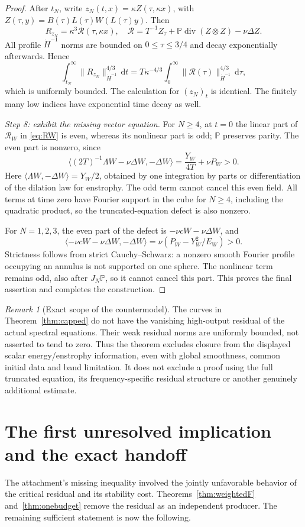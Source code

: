 \documentclass[11pt,a4paper]{article}
\theoremstyle{definition}\newtheorem{definition}[theorem]{Definition}
\theoremstyle{remark}\newtheorem{remark}[theorem]{Remark}
\newcommand{\PP}{\mathbb P}
\newcommand{\dd}{\,\mathrm d}
\newcommand{\norm}[1]{\lVert #1\rVert}
\newcommand{\ip}[2]{\langle #1,#2\rangle}
\newcommand{\diver}{\operatorname{div}}
\numberwithin{equation}{section}
\begin{document}
\begin{proof}
After $t_N$, write $z_N(t,x)=\kappa Z(\tau,\kappa x)$, with
$Z(\tau,y)=B(\tau)L(\tau)W(L(\tau)y)$. Then
\[
 R_{z_N}=\kappa^3\mathcal R(\tau,\kappa x),\quad
 \mathcal R=T^{-1}Z_\tau+\PP\diver(Z\otimes Z)-\nu\Delta Z.
\]
All profile $\dot H^{-1}$ norms are bounded on $0\le\tau\le3/4$ and decay exponentially afterwards. Hence
\[
 \int_{t_N}^\infty\norm{R_{z_N}}_{\dot H^{-1}}^{4/3}\dd t
 =T\kappa^{-4/3}\int_0^\infty\norm{\mathcal R(\tau)}_{\dot H^{-1}}^{4/3}\dd\tau,
\]
which is uniformly bounded. The calculation for $(z_N)_t$ is identical. The finitely many low indices have exponential time decay as well.

\emph{Step 8: exhibit the missing vector equation.}
For $N\ge4$, at $t=0$ the linear part of $\mathcal R_W$ in \eqref{eq:RW} is even, whereas its nonlinear part is odd; $\PP$ preserves parity. The even part is nonzero, since
\[
 \ip{(2T)^{-1}\Lambda W-\nu\Delta W}{-\Delta W}
 =\frac{Y_W}{4T}+\nu P_W>0.
\]
Here $\ip{\Lambda W}{-\Delta W}=Y_W/2$, obtained by one integration by parts or differentiation of the dilation law for enstrophy. The odd term cannot cancel this even field. All terms at time zero have Fourier support in the cube for $N\ge4$, including the quadratic product, so the truncated-equation defect is also nonzero.

For $N=1,2,3$, the even part of the defect is $-\nu cW-\nu\Delta W$, and
\[
 \ip{-\nu cW-\nu\Delta W}{-\Delta W}
 =\nu(P_W-Y_W^2/E_W)>0.
\]
Strictness follows from strict Cauchy--Schwarz: a nonzero smooth Fourier profile occupying an annulus is not supported on one sphere. The nonlinear term remains odd, also after $J_N\PP$, so it cannot cancel this part. This proves the final assertion and completes the construction.
\end{proof}

\begin{remark}[Exact scope of the countermodel]
The curves in Theorem~\ref{thm:capped} do not have the vanishing high-output residual of the actual spectral equations. Their weak residual norms are uniformly bounded, not asserted to tend to zero. Thus the theorem excludes closure from the displayed scalar energy/enstrophy information, even with global smoothness, common initial data and band limitation. It does not exclude a proof using the full truncated equation, its frequency-specific residual structure or another genuinely additional estimate.
\end{remark}

\section{The first unresolved implication and the exact handoff}
\label{sec:boundary}
The attachment's missing inequality involved the jointly unfavorable behavior of the critical residual and its stability cost. Theorems~\ref{thm:weightedF} and~\ref{thm:onebudget} remove the residual as an independent producer. The remaining sufficient statement is now the following.
\end{document}
